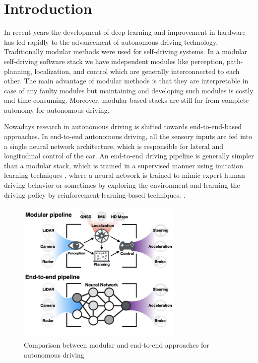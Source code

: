 

    \chapter{Introduction}
    In recent years the development of deep learning and improvement in hardware has led rapidly to the advancement of autonomous driving technology. Traditionally modular methods were used for self-driving systems. In a modular self-driving software stack we have independent modules like perception, path-planning, localization, and control which are generally interconnected to each other. The main advantage of modular methods is that they are interpretable in case of any faulty modules but maintaining and developing such modules is costly and time-consuming. Moreover, modular-based stacks are still far from complete autonomy for autonomous driving.
    \par Nowadays research in autonomous driving is shifted towards end-to-end-based approaches. In end-to-end autonomous driving, all the sensory inputs are fed into a single neural network architecture, which is responsible for lateral and longitudinal control of the car.  An end-to-end driving pipeline is generally simpler than a modular stack, which is trained in a supervised manner using imitation learning techniques \cite{DBLP:journals/corr/abs-1710-02410}, \cite{pan2019agile} where a neural network is trained to mimic expert human driving behavior or sometimes by exploring the environment and learning the driving policy by reinforcement-learning-based techniques. \cite{DBLP:journals/corr/abs-1807-00412}.  

     \begin{figure}[h]
    \centering
    \includegraphics[width=8cm, height=7cm]{images/Modularvsend.png}
    \caption{Comparison between modular and end-to-end approaches for autonomous driving \cite{DBLP:journals/corr/abs-2003-06404}}
    \end{figure}
    
